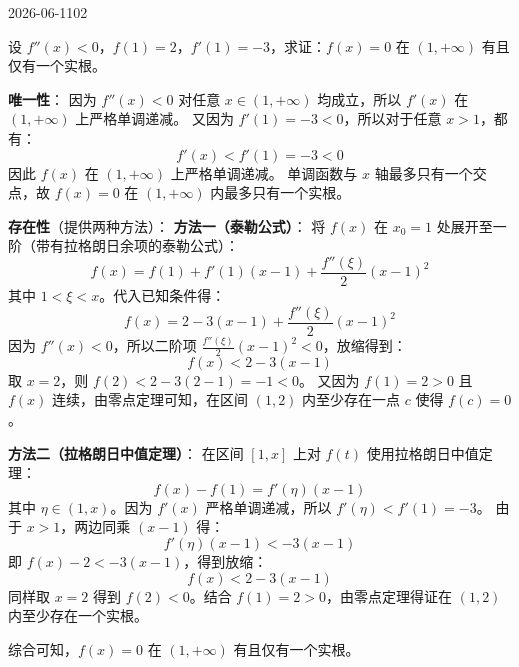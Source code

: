 \begin{mistake}{2026-06-11}{02}

\begin{problemcontent}
设 \(f''(x) < 0\)，\(f(1) = 2\)，\(f'(1) = -3\)，求证：\(f(x) = 0\) 在 \((1, +\infty)\) 有且仅有一个实根。
\end{problemcontent}

\begin{solutioncontent}
\textbf{唯一性}：
因为 \(f''(x) < 0\) 对任意 \(x \in (1, +\infty)\) 均成立，所以 \(f'(x)\) 在 \((1, +\infty)\) 上严格单调递减。
又因为 \(f'(1) = -3 < 0\)，所以对于任意 \(x > 1\)，都有：
\[ f'(x) < f'(1) = -3 < 0 \]
因此 \(f(x)\) 在 \((1, +\infty)\) 上严格单调递减。
单调函数与 \(x\) 轴最多只有一个交点，故 \(f(x) = 0\) 在 \((1, +\infty)\) 内最多只有一个实根。

\textbf{存在性}（提供两种方法）：
\textbf{方法一（泰勒公式）}：
将 \(f(x)\) 在 \(x_0 = 1\) 处展开至一阶（带有拉格朗日余项的泰勒公式）：
\[ f(x) = f(1) + f'(1)(x-1) + \frac{f''(\xi)}{2}(x-1)^2 \]
其中 \(1 < \xi < x\)。代入已知条件得：
\[ f(x) = 2 - 3(x-1) + \frac{f''(\xi)}{2}(x-1)^2 \]
因为 \(f''(x) < 0\)，所以二阶项 \(\frac{f''(\xi)}{2}(x-1)^2 < 0\)，放缩得到：
\[ f(x) < 2 - 3(x-1) \]
取 \(x = 2\)，则 \(f(2) < 2 - 3(2-1) = -1 < 0\)。
又因为 \(f(1) = 2 > 0\) 且 \(f(x)\) 连续，由零点定理可知，在区间 \((1, 2)\) 内至少存在一点 \(c\) 使得 \(f(c) = 0\)。

\textbf{方法二（拉格朗日中值定理）}：
在区间 \([1, x]\) 上对 \(f(t)\) 使用拉格朗日中值定理：
\[ f(x) - f(1) = f'(\eta)(x-1) \]
其中 \(\eta \in (1, x)\)。因为 \(f'(x)\) 严格单调递减，所以 \(f'(\eta) < f'(1) = -3\)。
由于 \(x > 1\)，两边同乘 \((x-1)\) 得：
\[ f'(\eta)(x-1) < -3(x-1) \]
即 \(f(x) - 2 < -3(x-1)\)，得到放缩：
\[ f(x) < 2 - 3(x-1) \]
同样取 \(x = 2\) 得到 \(f(2) < 0\)。结合 \(f(1) = 2 > 0\)，由零点定理得证在 \((1,2)\) 内至少存在一个实根。

综合可知，\(f(x) = 0\) 在 \((1, +\infty)\) 有且仅有一个实根。
\end{solutioncontent}


\end{mistake}
